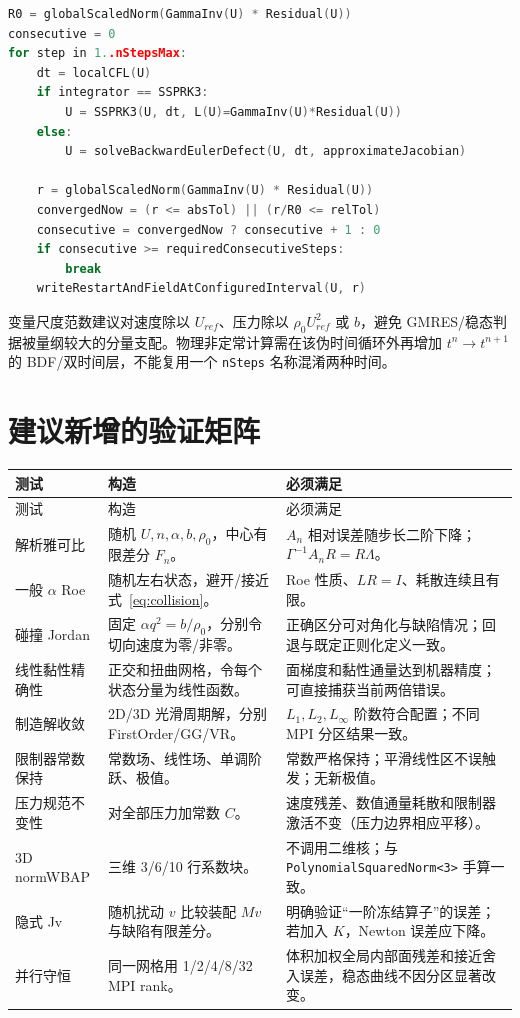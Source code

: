 \documentclass[UTF8,11pt,a4paper]{ctexart}
\newcommand{\code}[1]{\nolinkurl{#1}}
\begin{document}
\begin{lstlisting}[language=C++,caption={稳态伪时间推进与真实收敛判据}]
R0 = globalScaledNorm(GammaInv(U) * Residual(U))
consecutive = 0
for step in 1..nStepsMax:
    dt = localCFL(U)
    if integrator == SSPRK3:
        U = SSPRK3(U, dt, L(U)=GammaInv(U)*Residual(U))
    else:
        U = solveBackwardEulerDefect(U, dt, approximateJacobian)

    r = globalScaledNorm(GammaInv(U) * Residual(U))
    convergedNow = (r <= absTol) || (r/R0 <= relTol)
    consecutive = convergedNow ? consecutive + 1 : 0
    if consecutive >= requiredConsecutiveSteps:
        break
    writeRestartAndFieldAtConfiguredInterval(U, r)
\end{lstlisting}

变量尺度范数建议对速度除以 $U_{ref}$、压力除以 $\rho_0U_{ref}^2$ 或 $b$，避免 GMRES/稳态判据被量纲较大的分量支配。物理非定常计算需在该伪时间循环外再增加 $t^n\to t^{n+1}$ 的 BDF/双时间层，不能复用一个 \code{nSteps} 名称混淆两种时间。

\section{建议新增的验证矩阵}

\begin{longtable}{p{}p{}p{}}
\toprule
测试 & 构造 & 必须满足\\
\midrule
\endfirsthead
\toprule
测试 & 构造 & 必须满足\\
\midrule
\endhead
解析雅可比 & 随机 $U,n,\alpha,b,\rho_0$，中心有限差分 $F_n$。 & $A_n$ 相对误差随步长二阶下降；$\Gamma^{-1}A_nR=R\Lambda$。\\
一般 $\alpha$ Roe & 随机左右状态，避开/接近式~\eqref{eq:collision}。 & Roe 性质、$LR=I$、耗散连续且有限。\\
碰撞 Jordan & 固定 $\alpha q^2=b/\rho_0$，分别令切向速度为零/非零。 & 正确区分可对角化与缺陷情况；回退与既定正则化定义一致。\\
线性黏性精确性 & 正交和扭曲网格，令每个状态分量为线性函数。 & 面梯度和黏性通量达到机器精度；可直接捕获当前两倍错误。\\
制造解收敛 & 2D/3D 光滑周期解，分别 FirstOrder/GG/VR。 & $L_1,L_2,L_\infty$ 阶数符合配置；不同 MPI 分区结果一致。\\
限制器常数保持 & 常数场、线性场、单调阶跃、极值。 & 常数严格保持；平滑线性区不误触发；无新极值。\\
压力规范不变性 & 对全部压力加常数 $C$。 & 速度残差、数值通量耗散和限制器激活不变（压力边界相应平移）。\\
3D normWBAP & 三维 3/6/10 行系数块。 & 不调用二维核；与 \code{PolynomialSquaredNorm<3>} 手算一致。\\
隐式 Jv & 随机扰动 $v$ 比较装配 $Mv$ 与缺陷有限差分。 & 明确验证“一阶冻结算子”的误差；若加入 $K$，Newton 误差应下降。\\
并行守恒 & 同一网格用 1/2/4/8/32 MPI rank。 & 体积加权全局内部面残差和接近舍入误差，稳态曲线不因分区显著改变。\\
\bottomrule
\end{longtable}
\end{document}
